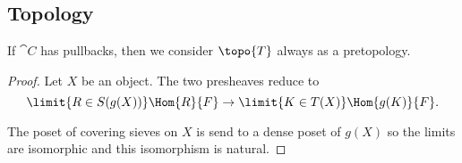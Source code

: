\subsection{Topology}








If $\cat{C}$ has pullbacks, then we consider $\topo{T}$ always as a pretopology.


\begin{proof}
Let $X$ be an object.
The two presheaves reduce to
\[ \limit{R\in S(g(X))} \Hom{R}{F} \rightarrow \limit{K\in T(X)} \Hom{g(K)}{F}.\]

The poset of covering sieves on $X$ is send to a dense
poset of $g(X)$ so the limits are isomorphic and this isomorphism is natural.
\end{proof}